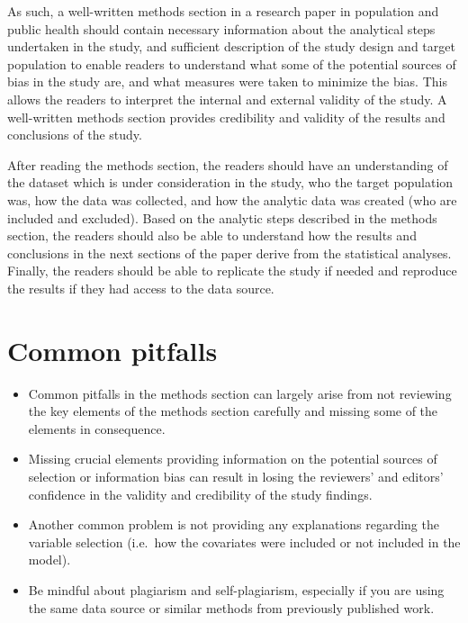 \documentclass[
]{book}
\providecommand{\tightlist}{%
  \setlength{\itemsep}{0pt}\setlength{\parskip}{0pt}}
\begin{document}
As such, a well-written methods section in a research paper in population and public health should contain necessary information about the analytical steps undertaken in the study, and sufficient description of the study design and target population to enable readers to understand what some of the potential sources of bias in the study are, and what measures were taken to minimize the bias. This allows the readers to interpret the internal and external validity of the study. A well-written methods section provides credibility and validity of the results and conclusions of the study.

After reading the methods section, the readers should have an understanding of the dataset which is under consideration in the study, who the target population was, how the data was collected, and how the analytic data was created (who are included and excluded). Based on the analytic steps described in the methods section, the readers should also be able to understand how the results and conclusions in the next sections of the paper derive from the statistical analyses. Finally, the readers should be able to replicate the study if needed and reproduce the results if they had access to the data source.

\hypertarget{common-pitfalls-1}{%
\section{Common pitfalls}\label{common-pitfalls-1}}

\begin{itemize}
\tightlist
\item
  Common pitfalls in the methods section can largely arise from not reviewing the key elements of the methods section carefully and missing some of the elements in consequence.
\item
  Missing crucial elements providing information on the potential sources of selection or information bias can result in losing the reviewers' and editors' confidence in the validity and credibility of the study findings.
\item
  Another common problem is not providing any explanations regarding the variable selection (i.e.~how the covariates were included or not included in the model).\\
\item
  Be mindful about plagiarism and self-plagiarism, especially if you are using the same data source or similar methods from previously published work.
\end{itemize}
\end{document}
